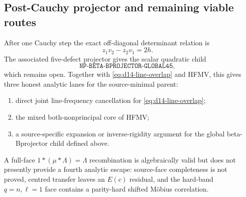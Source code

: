 \documentclass[11pt]{article}
\theoremstyle{definition}
\newcommand{\1}{\mathbf 1}
\begin{document}
\subsection{Post-Cauchy projector and remaining viable routes}
After one Cauchy step the exact off-diagonal determinant relation is
\[
 z_1v_2-z_2v_1=2h.
\]
The associated five-defect projector gives the scalar quadratic child
\[
 \boxed{\texttt{NP-BETA-BPROJECTOR-GLOBAL45}},
\]
which remains open.  Together with \eqref{eq:d14-line-overlap} and HFMV, this
gives three honest analytic lanes for the source-minimal parent:
\begin{enumerate}[label=(\roman*)]
 \item direct joint line-frequency cancellation for
       \eqref{eq:d14-line-overlap};
 \item the mixed both-nonprincipal core of HFMV;
 \item a source-specific expansion or inverse-rigidity argument for the
       global beta-Bprojector child defined above.
\end{enumerate}
A full-face $1*(\mu*\Lambda)=\Lambda$ recombination is algebraically valid but
does not presently provide a fourth analytic escape: source-face completeness
is not proved, centred transfer leaves an $E(c)$ residual, and the hard-band
$q=n,\ell=1$ face contains a parity-hard shifted M\"obius correlation.
\end{document}
